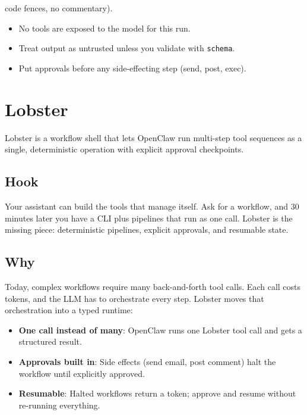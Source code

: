 code fences, no commentary).
\begin{itemize}
  \item No tools are exposed to the model for this run.
  \item Treat output as untrusted unless you validate with \texttt{schema}.
  \item Put approvals before any side-effecting step (send, post, exec).
\end{itemize}



\clearpage

\section{Lobster}


Lobster is a workflow shell that lets OpenClaw run multi-step tool sequences as a single, deterministic operation with explicit approval checkpoints.

\subsection{Hook}


Your assistant can build the tools that manage itself. Ask for a workflow, and 30 minutes later you have a CLI plus pipelines that run as one call. Lobster is the missing piece: deterministic pipelines, explicit approvals, and resumable state.

\subsection{Why}


Today, complex workflows require many back-and-forth tool calls. Each call costs tokens, and the LLM has to orchestrate every step. Lobster moves that orchestration into a typed runtime:

\begin{itemize}
  \item \textbf{One call instead of many}: OpenClaw runs one Lobster tool call and gets a structured result.
  \item \textbf{Approvals built in}: Side effects (send email, post comment) halt the workflow until explicitly approved.
  \item \textbf{Resumable}: Halted workflows return a token; approve and resume without re-running everything.
\end{itemize}


